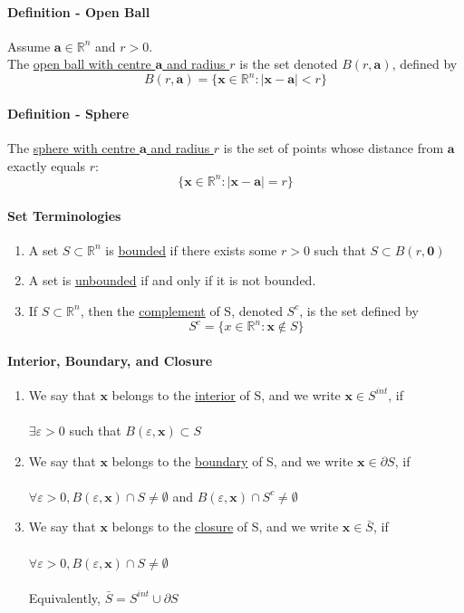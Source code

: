 \documentclass[11pt]{article}
\newcommand{\tb}[1]{\textbf{#1}}
\newcommand{\real}[0]{\mathbb{R}}
\newcommand{\under}[1]{\underline{#1}}
\newcommand{\vx}[0]{\tb{x}}
\newcommand{\vo}[0]{\tb{0}}
\newcommand{\va}[0]{\tb{a}}
\begin{document}
\paragraph{Definition - Open Ball}
Assume $\va \in \real^n$ and $r > 0$. \\ The \under{open ball with centre $\va$ and radius $r$} is the set denoted $B(r, \va)$, defined by
$$ B(r, \va) = \{\vx \in \real^n: |\vx - \va| < r \}$$

\paragraph{Definition - Sphere}
The \under{sphere with centre $\va$ and radius $r$} is the set of points whose distance from $\va$ exactly equals $r$:
$$ \{ \vx \in \real^n : |\vx - \va| = r \}$$

\paragraph{Set Terminologies}
\begin{enumerate}
	\item A set $S \subset \real^n$ is \under{bounded} if there exists some $r > 0$ such that $S \subset B(r, \vo)$
	\item A set is \under{unbounded} if and only if it is not bounded.
	\item If $ S \subset \real^n$, then the \under{complement} of S, denoted $S^c$, is the set
	defined by $$ S^c = \{x \in \real^n: \vx \notin S\}$$
\end{enumerate}
\paragraph{Interior, Boundary, and Closure}
\begin{enumerate}
    \item We say that $\vx$ belongs to the \under{interior} of S, and we write $\vx \in S^{int}$, if \\\\ $\exists \varepsilon > 0$ such that $B(\varepsilon, \vx) \subset S$
    \item We say that $\vx$ belongs to the \under{boundary} of S, and we write $\vx \in \partial S$, if \\\\ $\forall \varepsilon > 0, B(\varepsilon, \vx) \cap S \neq \emptyset$ and
    $B(\varepsilon, \vx) \cap S^c \neq \emptyset$
    \item We say that $\vx$ belongs to the \under{closure} of S, and we write $\vx \in \bar{S}$, if \\\\ $\forall \varepsilon > 0, B(\varepsilon, \vx) \cap S \neq \emptyset$ \\\\
    Equivalently, $\bar{S} = S^{int} \cup \partial S$
\end{enumerate}
\end{document}
